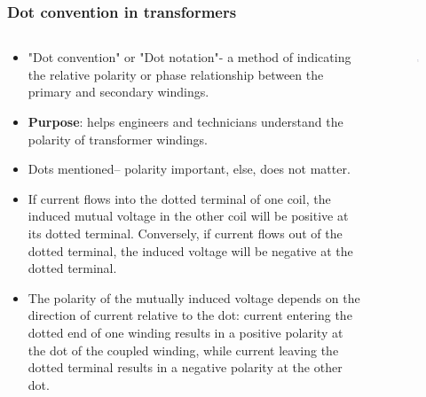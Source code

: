 \begin{frame}
	\frametitle{Dot convention in transformers}
    \begin{columns}
     \begin{column}{0.75\textwidth}
      \begin{itemize}
        \item "Dot convention" or "Dot notation"- a method of indicating the relative polarity or phase relationship between the primary and secondary windings.
        \item \textbf{Purpose}: helps engineers and technicians understand the polarity of transformer windings.
        \item Dots mentioned-- polarity important, else, does not matter. 
        \item If current flows into the dotted terminal of one coil, the induced mutual voltage in the other coil will be positive at its dotted terminal. Conversely, if current flows out of the dotted terminal, the induced voltage will be negative at the dotted terminal.
        \item The polarity of the mutually induced voltage depends on the direction of current relative to the dot: current entering the dotted end of one winding results in a positive polarity at the dot of the coupled winding, while current leaving the dotted terminal results in a negative polarity at the other dot.
      \end{itemize}
      \end{column}
      \begin{column}{0.25\textwidth}
			\onslide<1->
			\begin{figure}
				\centering
				\includegraphics[height=0.575\textheight]{fig/lec04/dot_convention.pdf}

\end{figure}
\end{column}
\end{columns}
\end{frame}
